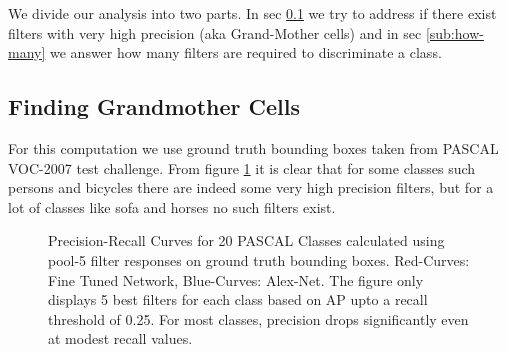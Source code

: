 We divide our analysis into two parts. In sec \ref{sub:class-specific-unit} we try to address if there exist filters with very high precision (aka Grand-Mother cells) and in sec \ref{sub:how-many} we answer how many filters are required to discriminate a class. 

\subsection{Finding Grandmother Cells}
\label{sub:class-specific-unit}

For this computation we use ground truth bounding boxes taken from PASCAL VOC-2007 test challenge.
From figure \ref{fig:ap} it is clear that for some classes such persons and bicycles there are indeed some very high precision filters, but for a lot of classes like sofa and horses no such filters exist. 

\begin{figure}[t!]
\centering
{}
\caption{Precision-Recall Curves for 20 PASCAL Classes calculated using pool-5 filter responses on ground truth bounding boxes. Red-Curves: Fine Tuned Network, Blue-Curves: Alex-Net. The figure only displays 5 best filters for each class based on AP  upto a recall threshold of 0.25. For most classes, precision drops significantly even at modest recall values.}
\label{fig:ap}
\end{figure}


